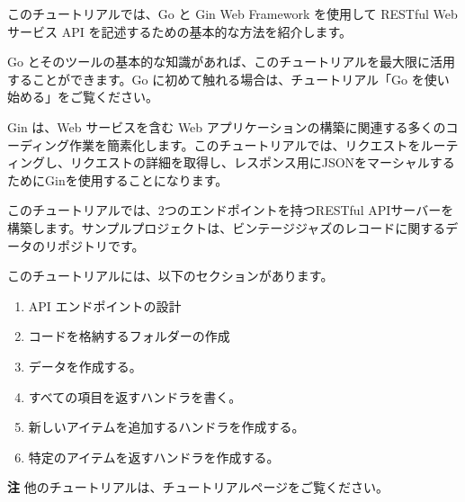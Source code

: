 このチュートリアルでは、Go と Gin Web Framework を使用して RESTful Web
サービス API を記述するための基本的な方法を紹介します。

Go
とそのツールの基本的な知識があれば、このチュートリアルを最大限に活用することができます。Go
に初めて触れる場合は、チュートリアル「Go を使い始める」をご覧ください。

Gin は、Web サービスを含む Web
アプリケーションの構築に関連する多くのコーディング作業を簡素化します。このチュートリアルでは、リクエストをルーティングし、リクエストの詳細を取得し、レスポンス用にJSONをマーシャルするためにGinを使用することになります。

このチュートリアルでは、2つのエンドポイントを持つRESTful
APIサーバーを構築します。サンプルプロジェクトは、ビンテージジャズのレコードに関するデータのリポジトリです。

このチュートリアルには、以下のセクションがあります。

\begin{enumerate}
\item
  API エンドポイントの設計
\item
  コードを格納するフォルダーの作成
\item
  データを作成する。
\item
  すべての項目を返すハンドラを書く。
\item
  新しいアイテムを追加するハンドラを作成する。
\item
  特定のアイテムを返すハンドラを作成する。
\end{enumerate}

\textbf{注} 他のチュートリアルは、チュートリアルページをご覧ください。